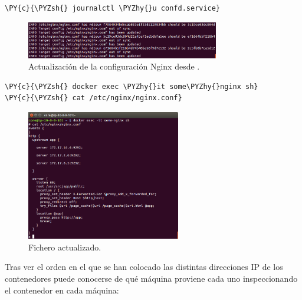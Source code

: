 \begin{framed_shaded}
\begin{Verbatim}[fontsize=\relsize{-2.5},fontseries=b,commandchars=\\\{\}]
\PY{c}{\PYZsh{} journalctl \PYZhy{}u confd.service}
\end{Verbatim}
\end{framed_shaded}

\begin{figure}[H]
\centering
\includegraphics[width=0.75\textwidth]{images/figures/update-journal-confd.png}
\caption{Actualización de la configuración Nginx desde .}
\end{figure}

\begin{framed_shaded}
\begin{Verbatim}[fontsize=\relsize{-2.5},fontseries=b,commandchars=\\\{\}]
\PY{c}{\PYZsh{} docker exec \PYZhy{}it some\PYZhy{}nginx sh}
\PY{c}{\PYZsh{} cat /etc/nginx/nginx.conf}
\end{Verbatim}
\end{framed_shaded}

\begin{figure}[H]
\centering
\includegraphics[width=0.6\textwidth]{images/figures/update-nginx-confd.png}
\caption{Fichero  actualizado.}
\end{figure}

Tras ver el orden en el que se han colocado las distintas direcciones IP de los contenedores  puede conocerse de qué máquina proviene cada uno inspeccionando el contenedor en cada máquina:

